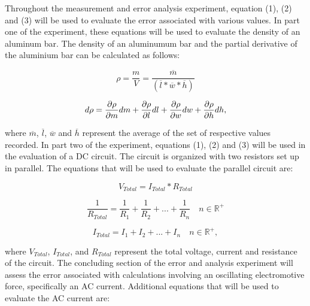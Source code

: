 \documentclass[twoside,10pt]{article}
\begin{document}
\begin{multicols}{2}
		\indent Throughout the measurement and error analysis experiment, equation (1), (2) and (3) will be used to evaluate the error associated with various values. In part one of the experiment, these equations will be used to evaluate the density of an aluminum bar. The density of an aluminumum bar and the partial derivative of the aluminium bar can be calculated as follows: 
		
		 \begin{small}
		 \begin{equation}
		 \rho = \frac{m}{V} =\frac{\overline{m}}{(\overline{l}*\overline{w}*\overline{h})}
		\end{equation}
		 \end{small}
	 
		\begin{small}
	 	\begin{equation}
	 	d \rho = \pdv{\rho}{m} dm + \pdv{\rho}{l} dl + \pdv{\rho}{w} dw + \pdv{\rho}{h} dh,
	 	\end{equation}
		\end{small}
	 
	 \noindent where $\overline{m}$, $\overline{l}$, $\overline{w}$ and $ \overline{h}$ represent the average of the set of respective values recorded. In part two of the experiment, equations (1), (2) and (3) will be used in the evaluation of a DC circuit. The circuit is organized with two resistors set up in parallel. The equations that will be used to evaluate the parallel circuit are: 
	 
	 	\begin{small}
	 	\begin{equation}
		V_{Total} = I_{Total} * R_{Total} 
	 	\end{equation}
		 \end{small}
	 		
	 	\begin{small}
	 	\begin{equation}
	 	\frac{1}{R_{Total}} = \frac{1}{R_1} + \frac{1}{R_2} + ... + \frac{1}{R_n}  \quad n \in \mathbb{R^+}
	 	\end{equation}
	 	\end{small}
 	
 		\begin{small}
 		\begin{equation}
 		I_{Total} = I_1 + I_2 + ... + I_n \quad n \in \mathbb{R^+},
 		\end{equation}
 		\end{small}
 	
 	\noindent where $V_{Total}$, $I_{Total}$, and $R_{Total}$ represent the total voltage, current and resistance of the circuit. The concluding section of the error and analysis experiment will assess the error associated with calculations involving an oscillating electromotive force, specifically an AC current. Additional equations that will be used to evaluate the AC current are:
 	

\end{multicols}
\end{document}
